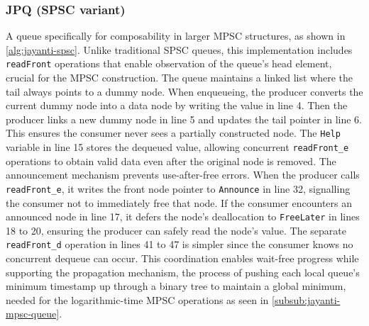 \subsubsection{\ac{JPQ} (\ac{SPSC} variant)}\label{subsub:jayanti-spsc-queue}
A queue specifically for composability in larger \ac{MPSC} structures, as shown in \cref{alg:jayanti-spsc}. Unlike traditional \ac{SPSC} queues, this implementation includes \texttt{readFront} operations that enable observation of the queue's head element, crucial for the \ac{MPSC} construction. The queue maintains a linked list where the tail always points to a dummy node. When enqueueing, the producer converts the current dummy node into a data node by writing the value in line 4. Then the producer links a new dummy node in line 5 and updates the tail pointer in line 6. This ensures the consumer never sees a partially constructed node. The \texttt{Help} variable in line 15 stores the dequeued value, allowing concurrent \texttt{readFront\_e} operations to obtain valid data even after the original node is removed. The announcement mechanism prevents use-after-free errors. When the producer calls \texttt{readFront\_e}, it writes the front node pointer to \texttt{Announce} in line 32, signalling the consumer not to immediately free that node. If the consumer encounters an announced node in line 17, it defers the node's deallocation to \texttt{FreeLater} in lines 18 to 20, ensuring the producer can safely read the node's value. The separate \texttt{readFront\_d} operation in lines 41 to 47 is simpler since the consumer knows no concurrent dequeue can occur. This coordination enables wait-free progress while supporting the propagation mechanism, the process of pushing each local queue's minimum timestamp up through a binary tree to maintain a global minimum, needed for the logarithmic-time \ac{MPSC} operations as seen in \cref{subsub:jayanti-mpsc-queue}. \cite{JayantiLog}


